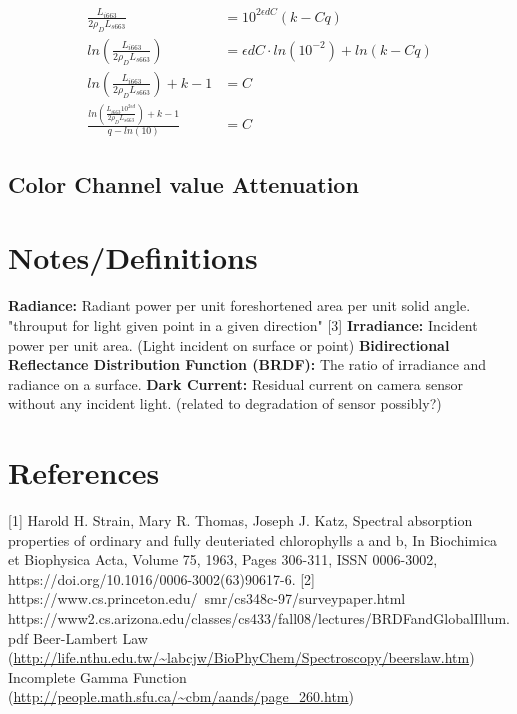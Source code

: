 \documentclass{article}
\begin{document}
\begin{align*}
\frac{L_{i 663}}{2\rho_D  L_{s 663}} &= 10^{2\epsilon d C}(k - Cq)\\
ln \left( \frac{L_{i 663} }{2\rho_D  L_{s 663}} \right ) &= \epsilon d C\cdot ln(10^{-2})+ln(k - Cq) \\
ln \left( \frac{L_{i 663} }{2\rho_D  L_{s 663}} \right ) +k -1 &= C \\
\frac{ln \left( \frac{L_{i 663} 10^{2\epsilon d} }{2\rho_D  L_{s 663}} \right ) +k -1}{q - ln(10)} &= C
\end{align*}

\subsection{Color Channel value Attenuation}



\section{Notes/Definitions}

\textbf{Radiance:} Radiant power per unit foreshortened area per unit solid angle. "throuput for light given point in a given direction" [3]
\newline
\textbf{Irradiance:} Incident power per unit area. (Light incident on surface or point)
\newline
\textbf{Bidirectional Reflectance Distribution Function (BRDF):} The ratio of irradiance and radiance on a surface.
\textbf{Dark Current:} Residual current on camera sensor without any incident light. (related to degradation of sensor possibly?)



\section{References}

[1] Harold H. Strain, Mary R. Thomas, Joseph J. Katz, Spectral absorption properties of ordinary and fully deuteriated chlorophylls a and b,
In Biochimica et Biophysica Acta, Volume 75, 1963, Pages 306-311,
ISSN 0006-3002, https://doi.org/10.1016/0006-3002(63)90617-6. \newline
[2] https://www.cs.princeton.edu/~smr/cs348c-97/surveypaper.html \newline
[3] https://www2.cs.arizona.edu/classes/cs433/fall08/lectures/BRDFandGlobalIllum.pdf
\newline
[4] Beer-Lambert Law (\url{http://life.nthu.edu.tw/~labcjw/BioPhyChem/Spectroscopy/beerslaw.htm}) \newline
[5] Incomplete Gamma Function (\url{http://people.math.sfu.ca/~cbm/aands/page_260.htm})
\end{document}
